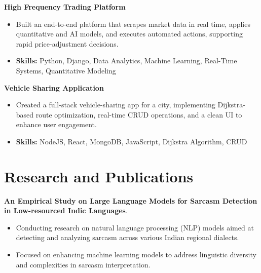 \documentclass[a4paper,11pt]{article}
\begin{document}
\vspace{1mm}
  \textbf{High Frequency Trading Platform  }
\vspace{-1.5mm} %
\begin{itemize}
  \item Built an end-to-end platform that scrapes market data in real time, applies quantitative and AI models, and executes automated actions, supporting rapid price-adjustment decisions.
\vspace{-3mm}
  \item \textbf{Skills:} Python, Django, Data Analytics, Machine Learning, Real-Time Systems, Quantitative Modeling
\end{itemize}


\vspace{1mm}
   \textbf{Vehicle Sharing Application }
\vspace{-1.5mm} %
\begin{itemize}
  \item Created a full-stack vehicle-sharing app for a city, implementing Dijkstra-based route optimization, real-time CRUD operations, and a clean UI to enhance user engagement.
\vspace{-3mm}
  \item \textbf{Skills:} NodeJS, React, MongoDB, JavaScript, Dijkstra Algorithm, CRUD
\end{itemize}



\section{\textbf{Research and Publications} \hfill }
\vspace{1mm}
  \textbf{An Empirical Study on Large Language Models for Sarcasm Detection in Low-resourced Indic Languages}.
\vspace{-1mm} %
\begin{itemize}
  \item Conducting research on natural language processing (NLP) models aimed at detecting and analyzing sarcasm across various Indian regional dialects.
\vspace{-3mm}
  \item Focused on enhancing machine learning models to address linguistic diversity and complexities in sarcasm interpretation.
\end{itemize}
\end{document}
